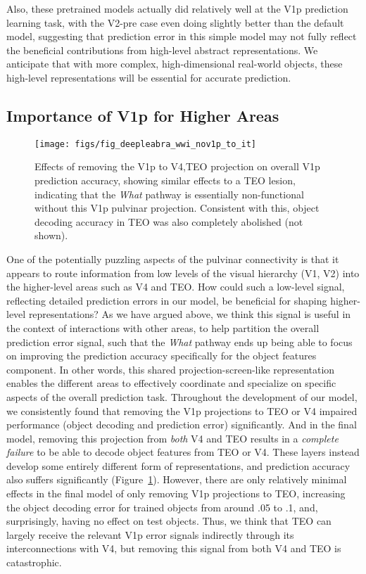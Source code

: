 \documentclass[11pt,twoside]{article}
\newif\myifpdf
\begin{document}
Also, these pretrained models actually did relatively well at the V1p prediction learning task, with the V2-pre case even doing slightly better than the default model, suggesting that prediction error in this simple model may not fully reflect the beneficial contributions from high-level abstract representations.  We anticipate that with more complex, high-dimensional real-world objects, these high-level representations will be essential for accurate prediction.

\subsection{Importance of V1p for Higher Areas}

\begin{figure}
  \centering\texttt{[image: figs/fig\_deepleabra\_wwi\_nov1p\_to\_it]}
  \caption{\footnotesize Effects of removing the V1p to V4,TEO projection on overall V1p prediction accuracy, showing similar effects to a TEO lesion, indicating that the {\em What} pathway is essentially non-functional without this V1p pulvinar projection.  Consistent with this, object decoding accuracy in TEO was also completely abolished (not shown).}
  \label{fig.nov1p_to_it}
\end{figure}

One of the potentially puzzling aspects of the pulvinar connectivity is that it appears to route information from low levels of the visual hierarchy (V1, V2) into the higher-level areas such as V4 and TEO.  How could such a low-level signal, reflecting detailed prediction errors in our model, be beneficial for shaping higher-level representations?  As we have argued above, we think this signal is useful in the context of interactions with other areas, to help partition the overall prediction error signal, such that the {\em What} pathway ends up being able to focus on improving the prediction accuracy specifically for the object features component.  In other words, this shared projection-screen-like representation enables the different areas to effectively coordinate and specialize on specific aspects of the overall prediction task.  Throughout the development of our model, we consistently found that removing the V1p projections to TEO or V4 impaired performance (object decoding and prediction error) significantly.  And in the final model, removing this projection from {\em both} V4 and TEO results in a {\em complete failure} to be able to decode object features from TEO or V4.  These layers instead develop some entirely different form of representations, and prediction accuracy also suffers significantly (Figure~\ref{fig.nov1p_to_it}).  However, there are only relatively minimal effects in the final model of only removing V1p projections to TEO, increasing the object decoding error for trained objects from around .05 to .1, and, surprisingly, having no effect on test objects.  Thus, we think that TEO can largely receive the relevant V1p error signals indirectly through its interconnections with V4, but removing this signal from both V4 and TEO is catastrophic.
\end{document}

